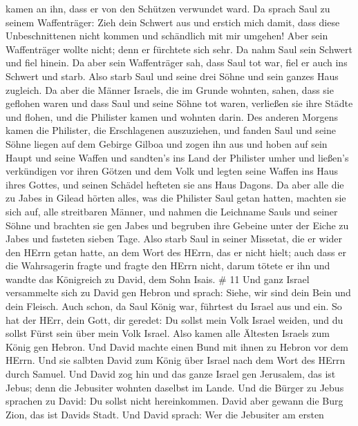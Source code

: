 kamen an ihn, dass er von den Schützen verwundet ward.  Da
sprach Saul zu seinem Waffenträger: Zieh dein Schwert aus und erstich
mich damit, dass diese Unbeschnittenen nicht kommen und schändlich mit
mir umgehen! Aber sein Waffenträger wollte nicht; denn er fürchtete sich
sehr. Da nahm Saul sein Schwert und fiel hinein.  Da aber
sein Waffenträger sah, dass Saul tot war, fiel er auch ins Schwert und
starb.  Also starb Saul und seine drei Söhne und sein ganzes
Haus zugleich.  Da aber die Männer Israels, die im Grunde
wohnten, sahen, dass sie geflohen waren und dass Saul und seine Söhne
tot waren, verließen sie ihre Städte und flohen, und die Philister kamen
und wohnten darin.  Des anderen Morgens kamen die Philister,
die Erschlagenen auszuziehen, und fanden Saul und seine Söhne liegen auf
dem Gebirge Gilboa  und zogen ihn aus und hoben auf sein
Haupt und seine Waffen und sandten's ins Land der Philister umher und
ließen's verkündigen vor ihren Götzen und dem Volk  und
legten seine Waffen ins Haus ihres Gottes, und seinen Schädel hefteten
sie ans Haus Dagons.  Da aber alle die zu Jabes in Gilead
hörten alles, was die Philister Saul getan hatten,  machten
sie sich auf, alle streitbaren Männer, und nahmen die Leichname Sauls
und seiner Söhne und brachten sie gen Jabes und begruben ihre Gebeine
unter der Eiche zu Jabes und fasteten sieben Tage.  Also
starb Saul in seiner Missetat, die er wider den HErrn getan hatte, an
dem Wort des HErrn, das er nicht hielt; auch dass er die Wahrsagerin
fragte  und fragte den HErrn nicht, darum tötete er ihn und
wandte das Königreich zu David, dem Sohn Isais. \# 11  Und
ganz Israel versammelte sich zu David gen Hebron und sprach: Siehe, wir
sind dein Bein und dein Fleisch.  Auch schon, da Saul König
war, führtest du Israel aus und ein. So hat der HErr, dein Gott, dir
geredet: Du sollst mein Volk Israel weiden, und du sollst Fürst sein
über mein Volk Israel.  Also kamen alle Ältesten Israels zum
König gen Hebron. Und David machte einen Bund mit ihnen zu Hebron vor
dem HErrn. Und sie salbten David zum König über Israel nach dem Wort des
HErrn durch Samuel.  Und David zog hin und das ganze Israel
gen Jerusalem, das ist Jebus; denn die Jebusiter wohnten daselbst im
Lande.  Und die Bürger zu Jebus sprachen zu David: Du sollst
nicht hereinkommen. David aber gewann die Burg Zion, das ist Davids
Stadt.  Und David sprach: Wer die Jebusiter am ersten
